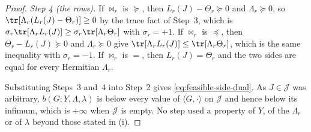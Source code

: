\begin{proof}
\emph{Step 4 (the rows).} If $\bowtie_r$ is $\succeq$, then
$L_r(J)-\Theta_r\succeq0$ and $\Lambda_r\succeq0$, so
$\tr[\Lambda_r(L_r(J)-\Theta_r)]\ge0$ by the trace fact of Step~3, which is
$\sigma_r\tr[\Lambda_rL_r(J)]\ge\sigma_r\tr[\Lambda_r\Theta_r]$ with
$\sigma_r=+1$. If $\bowtie_r$ is $\preceq$, then $\Theta_r-L_r(J)\succeq0$
and $\Lambda_r\succeq0$ give $\tr[\Lambda_rL_r(J)]\le\tr[\Lambda_r\Theta_r]$,
which is the same inequality with $\sigma_r=-1$. If $\bowtie_r$ is $=$, then
$L_r(J)=\Theta_r$ and the two sides are equal for every Hermitian
$\Lambda_r$.

Substituting Steps~3 and~4 into Step~2 gives \eqref{eq:feasible-side-dual}.
As $J\in\mathcal{J}$ was arbitrary, $b(G;Y,\Lambda,\lambda)$ is below every
value of $\langle G,\cdot\rangle$ on $\mathcal{J}$ and hence below its
infimum, which is $+\infty$ when $\mathcal{J}$ is empty. No step used a
property of $Y$, of the $\Lambda_r$ or of $\lambda$ beyond those stated in
(i).


\end{proof}
